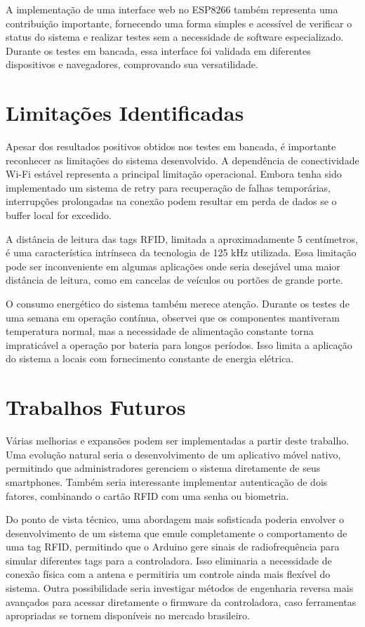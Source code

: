 A implementação de uma interface web no ESP8266 também representa uma contribuição importante, fornecendo uma forma simples e acessível de verificar o status do sistema e realizar testes sem a necessidade de software especializado. Durante os testes em bancada, essa interface foi validada em diferentes dispositivos e navegadores, comprovando sua versatilidade.

\section{Limitações Identificadas}

Apesar dos resultados positivos obtidos nos testes em bancada, é importante reconhecer as limitações do sistema desenvolvido. A dependência de conectividade Wi-Fi estável representa a principal limitação operacional. Embora tenha sido implementado um sistema de retry para recuperação de falhas temporárias, interrupções prolongadas na conexão podem resultar em perda de dados se o buffer local for excedido.

A distância de leitura das tags RFID, limitada a aproximadamente 5 centímetros, é uma característica intrínseca da tecnologia de 125 kHz utilizada. Essa limitação pode ser inconveniente em algumas aplicações onde seria desejável uma maior distância de leitura, como em cancelas de veículos ou portões de grande porte.

O consumo energético do sistema também merece atenção. Durante os testes de uma semana em operação contínua, observei que os componentes mantiveram temperatura normal, mas a necessidade de alimentação constante torna impraticável a operação por bateria para longos períodos. Isso limita a aplicação do sistema a locais com fornecimento constante de energia elétrica.

\section{Trabalhos Futuros}

Várias melhorias e expansões podem ser implementadas a partir deste trabalho. Uma evolução natural seria o desenvolvimento de um aplicativo móvel nativo, permitindo que administradores gerenciem o sistema diretamente de seus smartphones. Também seria interessante implementar autenticação de dois fatores, combinando o cartão RFID com uma senha ou biometria.

Do ponto de vista técnico, uma abordagem mais sofisticada poderia envolver o desenvolvimento de um sistema que emule completamente o comportamento de uma tag RFID, permitindo que o Arduino gere sinais de radiofrequência para simular diferentes tags para a controladora. Isso eliminaria a necessidade de conexão física com a antena e permitiria um controle ainda mais flexível do sistema. Outra possibilidade seria investigar métodos de engenharia reversa mais avançados para acessar diretamente o firmware da controladora, caso ferramentas apropriadas se tornem disponíveis no mercado brasileiro.

